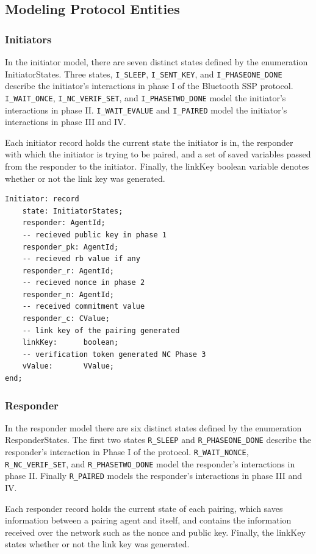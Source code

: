 \documentclass{acm_proc_article-sp}
\begin{document}
\subsection{Modeling Protocol Entities}

\subsubsection{Initiators}
In the initiator model, there are seven distinct states defined by the enumeration InitiatorStates. Three states, \texttt{I\_SLEEP}, \texttt{I\_SENT\_KEY}, and \texttt{I\_PHASEONE\_DONE} describe the initiator's interactions in phase I of the Bluetooth SSP protocol. \texttt{I\_WAIT\_ONCE}, \texttt{I\_NC\_VERIF\_SET}, and \texttt{I\_PHASETWO\_DONE} model the initiator's interactions in phase II. \texttt{I\_WAIT\_EVALUE} and \texttt{I\_PAIRED} model the initiator's interactions in phase III and IV.

Each initiator record holds the current state the initiator is in, the responder with which the initiator is trying to be paired, and a set of saved variables passed from the responder to the initiator. Finally, the linkKey boolean variable denotes whether or not the link key was generated.

\begin{verbatim}
Initiator: record
    state: InitiatorStates;
    responder: AgentId;
    -- recieved public key in phase 1
    responder_pk: AgentId;
    -- recieved rb value if any
    responder_r: AgentId;
    -- recieved nonce in phase 2
    responder_n: AgentId;
    -- received commitment value
    responder_c: CValue;
    -- link key of the pairing generated
    linkKey:      boolean;
    -- verification token generated NC Phase 3
    vValue:       VValue;
end;
\end{verbatim}

\subsubsection{Responder}
In the responder model there are six distinct states defined by the enumeration ResponderStates. The first two states \texttt{R\_SLEEP} and \texttt{R\_PHASEONE\_DONE} describe the responder's interaction in Phase I of the protocol. \texttt{R\_WAIT\_NONCE}, \texttt{R\_NC\_VERIF\_SET}, and \texttt{R\_PHASETWO\_DONE} model the responder's interactions in phase II. Finally \texttt{R\_PAIRED} models the responder's interactions in phase III and IV.

Each responder record holds the current state of each pairing, which saves information between a pairing agent and itself, and contains the information received over the network such as the nonce and public key. Finally, the linkKey states whether or not the link key was generated.
\end{document}
